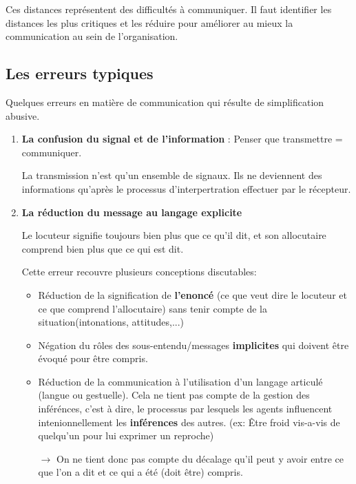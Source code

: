 \documentclass[11pt]{article} %
\begin{document}
Ces distances représentent des difficultés à communiquer. Il faut
identifier les distances les plus critiques et les réduire pour
améliorer au mieux la communication au sein de l'organisation.


\subsection{Les erreurs typiques}
Quelques erreurs en matière de communication qui résulte de
simplification abusive.

\begin{enumerate}
 \item \textbf{La confusion du signal et de l'information} : Penser que
    transmettre = communiquer.

    La transmission n'est qu'un ensemble de signaux. Ils ne deviennent
    des informations qu'après le processus d'interpertration effectuer
    par le récepteur.


 \item \textbf{La réduction du message au langage explicite}

     Le locuteur signifie toujours bien plus que ce qu'il dit, et son
    allocutaire comprend bien plus que ce qui est dit. 

    Cette erreur recouvre plusieurs conceptions discutables:

    \begin{itemize}
     \item Réduction de la signification de \textbf{l'enoncé} (ce que veut dire
     le locuteur et ce que comprend l'allocutaire) sans tenir compte de la
     situation(intonations, attitudes,...)

     \item Négation du rôles des sous-entendu/messages \textbf{implicites} qui
    doivent être évoqué pour être compris.

     \item Réduction de la communication à l'utilisation d'un langage
     articulé (langue ou gestuelle). Cela ne tient pas compte de la gestion
     des inférénces, c'est à dire, le processus par lesquels les agents
     influencent intenionnellement les \textbf{inférences} des autres. (ex: Être
     froid vis-a-vis de quelqu'un pour lui exprimer un reproche)
    \end{itemize} 

    \begin{itemize}
        \item[$\to$] On ne tient donc pas compte du décalage qu'il peut y
    avoir entre ce que l'on a dit et ce qui a été (doit être) compris.
    \end{itemize}
    


\end{enumerate}
\end{document}
